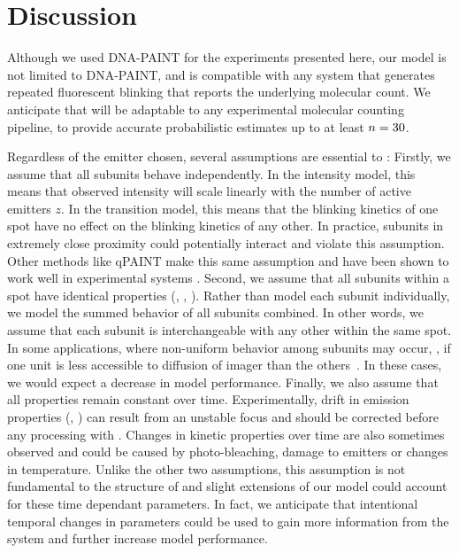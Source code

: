 \section{Discussion} \label{discussion}

Although we used DNA-PAINT for the experiments presented here, our model is not
limited to DNA-PAINT, and is compatible with any system that generates repeated
fluorescent blinking that reports the underlying molecular count.
  We anticipate that \ours will be adaptable to any experimental molecular
  counting pipeline, to provide accurate 
  probabilistic estimates up to at least $n=30$.

Regardless of the emitter chosen, several assumptions are
essential to \ours:
  Firstly, we assume that all subunits behave independently.
  In the intensity model, this means that observed intensity will scale
  linearly with the number of active emitters $z$.
  In the transition model, this means that the blinking kinetics of one spot
  have no effect on the blinking kinetics of any other.
  In practice, subunits in extremely close proximity could
  potentially interact and violate this assumption.
  Other methods like qPAINT make this same assumption and have been shown to
  work well in experimental systems \citep{fischer_quantitative_2021,
  jayasinghe_true_2018}. 
  Second, we assume that all subunits within a spot have identical properties
  (\pon, \poff, \re).
  Rather than model each subunit individually, we model the summed behavior
  of all subunits combined. 
  In other words, we assume that each subunit is
  interchangeable with any other within the same spot.
  In some applications, where non-uniform behavior among subunits may occur, \eg,
  if one unit is less accessible to diffusion of
  imager than the others~\citep{civitci_2020}. 
  In these cases, we would expect a decrease in model performance.
  Finally, we also assume that all properties remain constant over time. 
  Experimentally, drift in emission properties (\re, \rb) can result from 
  an unstable focus and should be corrected before any processing with
  \ours.
  Changes in kinetic properties over time are also sometimes observed and could
  be caused by photo-bleaching, damage to emitters or changes in temperature. 
  Unlike the other two assumptions, this assumption is not fundamental to the
  structure of \ours and slight extensions of our model could account for these
  time dependant parameters.
  In fact, we anticipate that intentional temporal changes in parameters could be used to gain more
  information from the system and further increase model performance.

